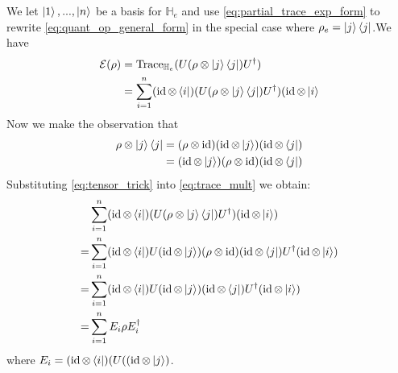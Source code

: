 \documentclass[12pt]{article}
\theoremstyle{plain}
\theoremstyle{definition}
\newcommand{\bb}[1]{\mathbb{#1}}
\newcommand{\call}[1]{\mathcal{#1}}
\begin{document}
	We let $\ket{1},...,\ket{n}$ be a basis for $\bb{H}_e$ and use \eqref{eq:partial_trace_exp_form} to rewrite \eqref{eq:quant_op_general_form} in the special case where $\rho_e = \ket{j}\bra{j}$.We have
	\begin{align}
		\call{E}(\rho) &= \operatorname{Trace}_{\bb{H}_e}(U (\rho \otimes \ket{j}\bra{j})U^\dagger)\\
		&= \sum_{i = 1}^n (\operatorname{id} \otimes \bra{i}) (U (\rho \otimes \ket{j}\bra{j})U^\dagger)(\operatorname{id} \otimes \ket{i}\label{eq:trace_mult}
	\end{align}
	Now we make the observation that
	\begin{align}
		\rho \otimes \ket{j}\bra{j} &= (\rho \otimes \operatorname{id})(\operatorname{id} \otimes \ket{j})(\operatorname{id} \otimes \bra{j})\\
		&= (\operatorname{id} \otimes \ket{j})(\rho \otimes \operatorname{id})(\operatorname{id} \otimes \bra{j})\label{eq:tensor_trick}
	\end{align}
	Substituting \eqref{eq:tensor_trick} into \eqref{eq:trace_mult} we obtain:
	\begin{align*}
		&\sum_{i = 1}^n (\operatorname{id} \otimes \bra{i}) (U (\rho \otimes \ket{j}\bra{j})U^\dagger)(\operatorname{id} \otimes \ket{i})\\
		= &\sum_{i = 1}^n (\operatorname{id} \otimes \bra{i}) U (\operatorname{id} \otimes \ket{j})(\rho \otimes \operatorname{id})(\operatorname{id} \otimes \bra{j})U^\dagger(\operatorname{id} \otimes \ket{i})\\
		= &\sum_{i = 1}^n (\operatorname{id} \otimes \bra{i}) U (\operatorname{id} \otimes \ket{j})(\operatorname{id} \otimes \bra{j})U^\dagger(\operatorname{id} \otimes \ket{i})\\
		= &\sum_{i = 1}^n E_i \rho E_i^\dagger
	\end{align*}
	where $E_i =(\operatorname{id} \otimes \bra{i}) (U ((\operatorname{id} \otimes \ket{j})$.
	
\end{document}
